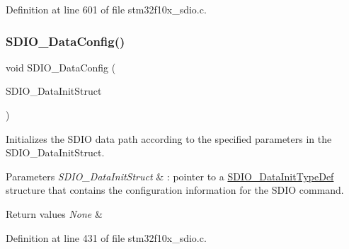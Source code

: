 Definition at line 601 of file stm32f10x\+\_\+sdio.\+c.

\mbox{\label{group___s_d_i_o___exported___functions_gad65d896ae919683585bda44a1e2afae4}} 
\subsubsection{\texorpdfstring{S\+D\+I\+O\+\_\+\+Data\+Config()}{SDIO\_DataConfig()}}
{\footnotesize\ttfamily void S\+D\+I\+O\+\_\+\+Data\+Config (\begin{DoxyParamCaption}\item[{\hyperlink{struct_s_d_i_o___data_init_type_def}{S\+D\+I\+O\+\_\+\+Data\+Init\+Type\+Def} $\ast$}]{S\+D\+I\+O\+\_\+\+Data\+Init\+Struct }\end{DoxyParamCaption})}



Initializes the S\+D\+IO data path according to the specified parameters in the S\+D\+I\+O\+\_\+\+Data\+Init\+Struct. 


\begin{DoxyParams}{Parameters}
{\em S\+D\+I\+O\+\_\+\+Data\+Init\+Struct} & \+: pointer to a \hyperlink{struct_s_d_i_o___data_init_type_def}{S\+D\+I\+O\+\_\+\+Data\+Init\+Type\+Def} structure that contains the configuration information for the S\+D\+IO command. \\
\hline
\end{DoxyParams}

\begin{DoxyRetVals}{Return values}
{\em None} & \\
\hline
\end{DoxyRetVals}


Definition at line 431 of file stm32f10x\+\_\+sdio.\+c.

\mbox{\label{group___s_d_i_o___exported___functions_gaa83209c09e921521aca2587fb5b22ea2}} 
